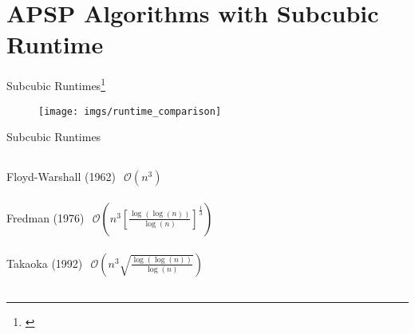 \section{APSP Algorithms with Subcubic Runtime}

\begin{frame}{Subcubic Runtimes\footnote[1]{\cite[Section~1]{Chan2007}}}
    \begin{figure}
        \texttt{[image: imgs/runtime\_comparison]}
    \end{figure}
\end{frame}

\begin{frame}{Subcubic Runtimes}
    \begin{columns}
        \begin{column}{.252\linewidth}
            {
                \begin{alertblock}{Floyd-Warshall (1962)}
                    $\begin{aligned}
                        \mathcal{O}\left( n^3 \right)
                    \end{aligned}$
                \end{alertblock}
            }

            {
                \begin{alertblock}{Fredman (1976)}
                    $\begin{aligned}
                        \mathcal{O}\left( n^3 {\left[ \frac{\log(\log(n))}{\log(n)} \right]}^{\frac{1}{3}} \right)
                    \end{aligned}$
                \end{alertblock}
            }
            
            {
                \begin{alertblock}{Takaoka (1992)}
                    $\begin{aligned}
                        \mathcal{O}\left( n^3 \sqrt{\frac{\log(\log(n))}{\log(n)}} \right)
                    \end{aligned}$
                \end{alertblock}
            }
            

\end{column}
\end{columns}
\end{frame}
